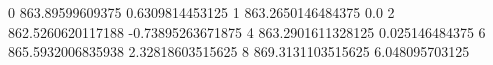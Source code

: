 0 863.89599609375 0.6309814453125
1 863.2650146484375 0.0
2 862.5260620117188 -0.73895263671875
4 863.2901611328125 0.025146484375
6 865.5932006835938 2.32818603515625
8 869.3131103515625 6.048095703125
